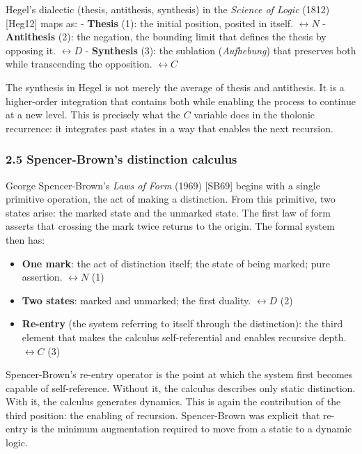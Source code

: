 \documentclass[
  11pt,
  letterpaper,
]{article}
\providecommand{\tightlist}{%
  \setlength{\itemsep}{0pt}\setlength{\parskip}{0pt}}
\begin{document}
Hegel's dialectic (thesis, antithesis, synthesis) in the \emph{Science
of Logic} (1812) {[}Heg12{]} maps as: - \textbf{Thesis} (1): the initial
position, posited in itself. \(\leftrightarrow N\) - \textbf{Antithesis}
(2): the negation, the bounding limit that defines the thesis by
opposing it. \(\leftrightarrow D\) - \textbf{Synthesis} (3): the
sublation (\emph{Aufhebung}) that preserves both while transcending the
opposition. \(\leftrightarrow C\)

The synthesis in Hegel is not merely the average of thesis and
antithesis. It is a higher-order integration that contains both while
enabling the process to continue at a new level. This is precisely what
the \(C\) variable does in the tholonic recurrence: it integrates past
states in a way that enables the next recursion.

\subsubsection{2.5 Spencer-Brown's distinction
calculus}\label{spencer-browns-distinction-calculus}

George Spencer-Brown's \emph{Laws of Form} (1969) {[}SB69{]} begins with
a single primitive operation, the act of making a distinction. From this
primitive, two states arise: the marked state and the unmarked state.
The first law of form asserts that crossing the mark twice returns to
the origin. The formal system then has:

\begin{itemize}
\tightlist
\item
  \textbf{One mark}: the act of distinction itself; the state of being
  marked; pure assertion. \(\leftrightarrow N\) (1)
\item
  \textbf{Two states}: marked and unmarked; the first duality.
  \(\leftrightarrow D\) (2)
\item
  \textbf{Re-entry} (the system referring to itself through the
  distinction): the third element that makes the calculus
  self-referential and enables recursive depth. \(\leftrightarrow C\)
  (3)
\end{itemize}

Spencer-Brown's re-entry operator is the point at which the system first
becomes capable of self-reference. Without it, the calculus describes
only static distinction. With it, the calculus generates dynamics. This
is again the contribution of the third position: the enabling of
recursion. Spencer-Brown was explicit that re-entry is the minimum
augmentation required to move from a static to a dynamic logic.
\end{document}
